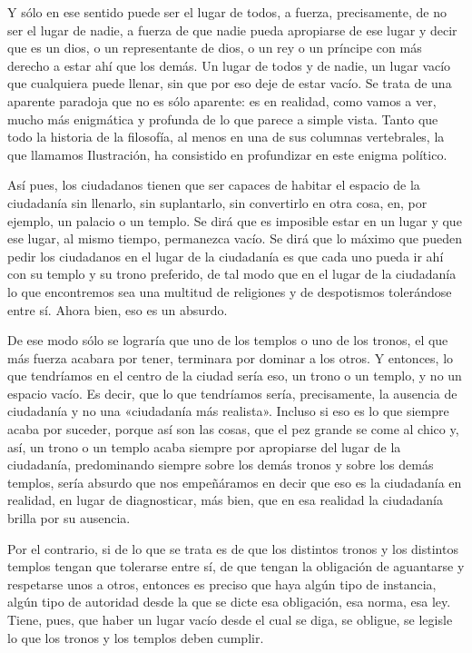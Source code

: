\documentclass[draft,9pt,letterpaper,twocolumn,openany]{extbook}
\newcommand{\notar}[1]{\marginnote{\small\sffamily #1}[-.8em]}
\begin{document}
 Y sólo en ese sentido puede ser el
lugar de todos, a fuerza, precisamente, de no ser el lugar
de nadie, a fuerza de que nadie pueda apropiarse de ese
lugar y decir que es un dios, o un representante de dios, o
un rey o un príncipe con más derecho a estar ahí que los
demás. Un lugar de todos y de nadie, un lugar vacío que
cualquiera puede llenar, sin que por eso deje de estar
vacío. Se trata de una aparente paradoja que no es sólo
aparente: es en realidad, como vamos a ver, mucho más
enigmática y profunda de lo que parece a simple vista.
Tanto que todo la historia de la filosofía, al menos en una
de sus columnas vertebrales, la que llamamos Ilustración,
ha consistido en profundizar en este enigma político.


Así pues, los ciudadanos tienen que ser capaces de
habitar el espacio de la ciudadanía sin llenarlo, sin
suplantarlo, sin convertirlo en otra cosa, en, por ejemplo, un
palacio o un templo. Se dirá que es imposible estar en un
lugar y que ese lugar, al mismo tiempo, permanezca vacío.
Se dirá que lo máximo que pueden pedir los ciudadanos en
el lugar de la ciudadanía es que cada uno pueda ir ahí con
su templo y su trono preferido, de tal modo que en el lugar
de la ciudadanía lo que encontremos sea una multitud de
religiones y de despotismos tolerándose entre sí. Ahora
bien, eso es un absurdo. 

De ese modo sólo se lograría que
uno de los templos o uno de los tronos, el que más fuerza
acabara por tener, terminara por dominar a los otros. Y
entonces, lo que tendríamos en el centro de la ciudad sería
eso, un trono o un templo, y no un espacio vacío. Es decir,
que lo que tendríamos sería, precisamente, la ausencia de
ciudadanía y no una «ciudadanía más realista». Incluso si
eso es lo que siempre acaba por suceder, porque así son
las cosas, que el pez grande se come al chico y, así, un
trono o un templo acaba siempre por apropiarse del lugar de
la ciudadanía, predominando siempre sobre los demás
tronos y sobre los demás templos, sería absurdo que nos
empeñáramos en decir que eso es la ciudadanía en realidad,
en lugar de diagnosticar, más bien, que en esa realidad la
ciudadanía brilla por su ausencia. 

Por el contrario, si de lo
que se trata es de que los distintos tronos y los distintos
templos tengan que tolerarse entre sí, de que tengan la
obligación de aguantarse y respetarse unos a otros,
entonces es preciso que haya algún tipo de instancia, algún
tipo de autoridad desde la que se dicte esa obligación, esa
norma, esa ley. Tiene, pues, que haber un lugar vacío desde
el cual se diga, se obligue, se legisle lo que los tronos y los
templos deben cumplir.
\end{document}
